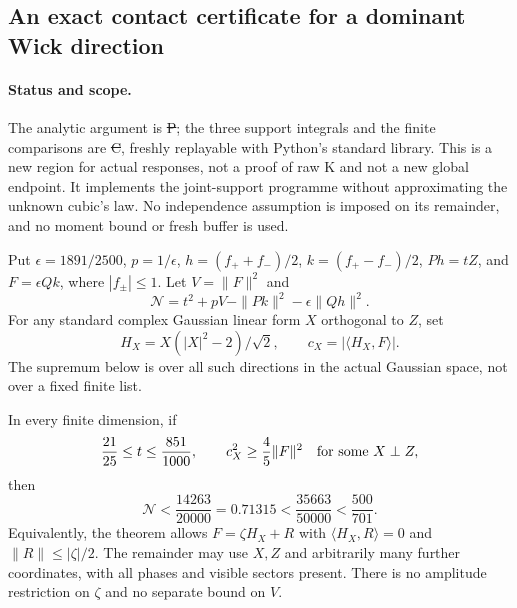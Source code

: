 \subsection{An exact contact certificate for a dominant Wick direction}
\label{sec:contact-concentration-cone}
\paragraph{Status and scope.}
The analytic argument is \st{P}; the three support integrals and the
finite comparisons are \st{C}, freshly replayable with Python's standard
library. This is a new region for actual responses, not a proof of raw K
and not a new global endpoint. It implements the joint-support programme
without approximating the unknown cubic's law. No independence assumption
is imposed on its remainder, and no moment bound or fresh buffer is used.

Put $\epsilon=1891/2500$, $p=1/\epsilon$, $h=(f_++f_-)/2$,
$k=(f_+-f_-)/2$, $Ph=tZ$, and $F=\epsilon Qk$, where $|f_\pm|\le1$.
Let $V=\|F\|^2$ and
\[
 \mathcal N=t^2+pV-\|Pk\|^2-\epsilon\|Qh\|^2.
\]
For any standard complex Gaussian linear form $X$ orthogonal to $Z$, set
\[
 H_X=X(|X|^2-2)/\sqrt2,\qquad
 c_X=|\langle H_X,F\rangle|.
\]
The supremum below is over all such directions in the actual Gaussian
space, not over a fixed finite list.

\begin{theorem}
\label{thm:contact-concentration-cone}
In every finite dimension, if
\[
 \frac{21}{25}\le t\le\frac{851}{1000},\qquad
 c_X^2\ge\frac45\|F\|^2\quad\hbox{for some }X\perp Z,
\]
then
\[
 \boxed{\quad\mathcal N<\frac{14263}{20000}=0.71315
            <\frac{35663}{50000}<\frac{500}{701}.\quad}
\]
Equivalently, the theorem allows $F=\zeta H_X+R$ with
$\langle H_X,R\rangle=0$ and $\|R\|\le|\zeta|/2$.
The remainder may use $X,Z$ and arbitrarily many further coordinates,
with all phases and visible sectors present. There is no amplitude
restriction on $\zeta$ and no separate bound on $V$.
\end{theorem}

